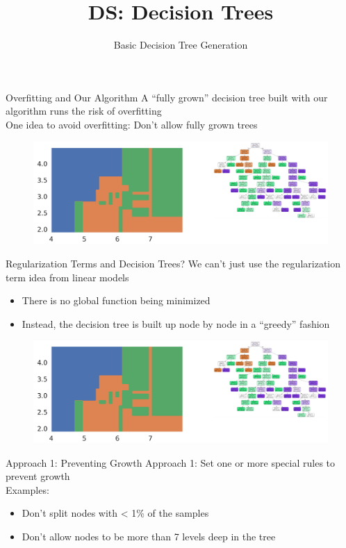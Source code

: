 \documentclass[aspectratio=169]{../latex_main/tntbeamer}  %
\title[Introduction]{DS: Decision Trees}
\subtitle{Basic Decision Tree Generation}
\begin{document}
	
	\maketitle
	\begin{frame}{Overfitting and Our Algorithm}
	    A “fully grown” decision tree built with our algorithm runs the risk of overfitting\\
	    \bigskip
	    One idea to avoid overfitting: Don’t allow fully grown trees
	    \begin{figure}
	        \centering
	        \includegraphics[scale=.45]{Bild52}
	    \end{figure}
	\end{frame}
	
	\begin{frame}{Regularization Terms and Decision Trees?}
	    We can’t just use the regularization term idea from linear models
	    \begin{itemize}
	        \item There is no global function being minimized
	        \item Instead, the decision tree is built up node by node in a “greedy” fashion
	    \end{itemize}
	    \begin{figure}
	        \centering
	        \includegraphics[scale=.45]{Bild52}
	    \end{figure}
	\end{frame}
	
	
	\begin{frame}{Approach 1: Preventing Growth}
	    Approach 1: Set one or more special rules to prevent growth\\
	    \bigskip
	    Examples:
	    \begin{itemize}
	        \item Don’t split nodes with < 1\% of the samples  
	        \item Don’t allow nodes to be more than 7 levels deep in the tree
	    \end{itemize}
	\end{frame}
	
\end{document}
